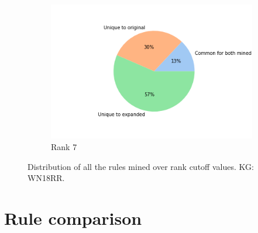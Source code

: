 \begin{figure}[h]
\begin{subfigure}[b]{0.3\textwidth}
            \centering 
            \includegraphics[width=\textwidth]{figures/results/ranks/pie_charts/('rank_cutoff', 7)_wn18rr.png}
            \caption[]%
            {{\small Rank 7}}    
            \label{fig:rank_7_pie_wn18rr}
        \end{subfigure}
        \hfill
        \caption[ ]
        {\small Distribution of all the rules mined over rank cutoff values. KG: WN18RR.} 
        \label{rank_pies_wn18rr}
    \end{figure}
    

\newpage
\section{Rule comparison}
\label{Rule_comparison}
